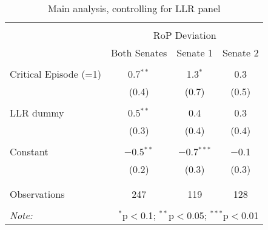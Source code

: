 
\begin{table}[!htbp] \centering 
  \caption{Main analysis, controlling for LLR panel} 
  \label{} 
\begin{tabular}{@{\extracolsep{5pt}}lccc} 
\\[-1.8ex]\hline 
\hline \\[-1.8ex] 
 & \multicolumn{3}{c}{RoP Deviation} \\ 
\cline{2-4} 
 & Both Senates & Senate 1 & Senate 2 \\ 
\hline \\[-1.8ex] 
 Critical Episode (=1) & 0.7$^{**}$ & 1.3$^{*}$ & 0.3 \\ 
  & (0.4) & (0.7) & (0.5) \\ 
  & & & \\ 
 LLR dummy & 0.5$^{**}$ & 0.4 & 0.3 \\ 
  & (0.3) & (0.4) & (0.4) \\ 
  & & & \\ 
 Constant & $-$0.5$^{**}$ & $-$0.7$^{***}$ & $-$0.1 \\ 
  & (0.2) & (0.3) & (0.3) \\ 
  & & & \\ 
\hline \\[-1.8ex] 
Observations & 247 & 119 & 128 \\ 
\hline 
\hline \\[-1.8ex] 
\textit{Note:}  & \multicolumn{3}{r}{$^{*}$p$<$0.1; $^{**}$p$<$0.05; $^{***}$p$<$0.01} \\ 
\end{tabular} 
\end{table} 

